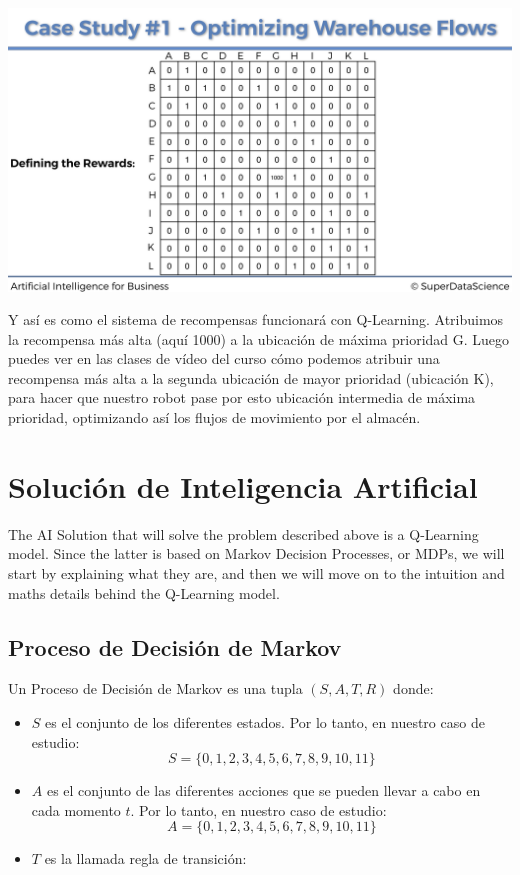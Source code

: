 \documentclass[]{book}
\providecommand{\tightlist}{%
  \setlength{\itemsep}{0pt}\setlength{\parskip}{0pt}}
\begin{document}
\includegraphics{Images/Rewards_Matrix_5.png}

Y así es como el sistema de recompensas funcionará con Q-Learning. Atribuimos la recompensa más alta (aquí 1000) a la ubicación de máxima prioridad G. Luego puedes ver en las clases de vídeo del curso cómo podemos atribuir una recompensa más alta a la segunda ubicación de mayor prioridad (ubicación K), para hacer que nuestro robot pase por esto ubicación intermedia de máxima prioridad, optimizando así los flujos de movimiento por el almacén.

\hypertarget{soluciuxf3n-de-inteligencia-artificial}{%
\section{Solución de Inteligencia Artificial}\label{soluciuxf3n-de-inteligencia-artificial}}

The AI Solution that will solve the problem described above is a Q-Learning model. Since the latter is based on Markov Decision Processes, or MDPs, we will start by explaining what they are, and then we will move on to the intuition and maths details behind the Q-Learning model.

\hypertarget{proceso-de-decisiuxf3n-de-markov}{%
\subsection{Proceso de Decisión de Markov}\label{proceso-de-decisiuxf3n-de-markov}}

Un Proceso de Decisión de Markov es una tupla \((S, A, T, R)\) donde:

\begin{itemize}
\tightlist
\item
  \(S\) es el conjunto de los diferentes estados. Por lo tanto, en nuestro caso de estudio: \[S = \{0,1,2,3,4,5,6,7,8,9,10,11\}\]
\item
  \(A\) es el conjunto de las diferentes acciones que se pueden llevar a cabo en cada momento \(t\). Por lo tanto, en nuestro caso de estudio: \[A = \{0,1,2,3,4,5,6,7,8,9,10,11\}\]
\item
  \(T\) es la llamada regla de transición:
\end{itemize}
\end{document}
